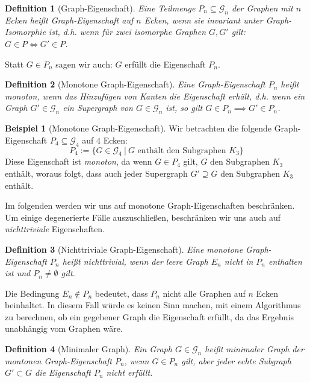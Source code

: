 \documentclass[10pt,a4paper, footheight=1mm]{scrreprt}
\newtheorem{definition}{Definition}
\theoremstyle{definition}
\newtheorem{examplex}{Beispiel}
\newenvironment{example}[1]
{ \begin{leftbar} \begin{examplex}#1}
{ \end{examplex} \ignorespacesafterend \end{leftbar} }
\begin{document}
\begin{definition}[Graph-Eigenschaft]
Eine Teilmenge $P_n \subseteq \mathcal{G}_n$ der Graphen mit
$n$ Ecken heißt \emph{Graph-Eigenschaft auf $n$ Ecken},
wenn sie invariant unter Graph-Isomorphie ist,
d.h. wenn für zwei isomorphe Graphen $G, G'$ gilt:
$G \in P \iff G' \in P$.
\end{definition}
Statt $G \in P_n$ sagen wir auch: $G$ erfüllt die Eigenschaft $P_n$.


\begin{definition}[Monotone Graph-Eigenschaft]
Eine Graph-Eigenschaft $P_n$ heißt \emph{monoton}, wenn das
Hinzufügen von Kanten die Eigenschaft erhält,
d.h. wenn ein Graph
$G' \in \mathcal{G}_n$ ein Supergraph von
$G \in \mathcal{G}_n$ ist, so gilt 
$G \in P_n \implies G' \in P_n$.
\end{definition}

\begin{example}[Monotone Graph-Eigenschaft]
\label{exmpl:Monotonie}
Wir betrachten die folgende Graph-Eigenschaft 
$P_4 \subseteq \mathcal{G}_4$ auf $4$ Ecken:
$$P_4 := \{ G \in \mathcal{G}_4 \ | \ G \text{ enthält den Subgraphen } K_3 \}$$
Diese Eigenschaft ist \emph{monoton}, da wenn 
$G \in P_4$ gilt, $G$ den Subgraphen $K_3$
enthält, woraus folgt, dass auch jeder Supergraph $G'\supseteq G$
den Subgraphen $K_3$ enthält. 
\end{example}

Im folgenden werden wir uns auf monotone Graph-Eigenschaften beschränken.
Um einige degenerierte Fälle auszuschließen, beschränken
wir uns auch auf \emph{nichttriviale} Eigenschaften.
\begin{definition}[Nichttriviale Graph-Eigenschaft]
Eine monotone Graph-Eigenschaft $P_n$ heißt \emph{nichttrivial},
wenn der leere Graph $E_n$ nicht in $P_n$ enthalten ist und
$P_n\neq \emptyset$ gilt.
\end{definition}
Die Bedingung $E_n \notin P_n$ bedeutet, dass $P_n$ nicht
alle Graphen auf $n$ Ecken beinhaltet. In diesem Fall würde
es keinen Sinn machen, mit einem Algorithmus zu berechnen,
ob ein gegebener Graph die Eigenschaft erfüllt, da das Ergebnis
unabhängig vom Graphen wäre.

\begin{definition}[Minimaler Graph]
Ein Graph $G \in \mathcal{G}_n$ heißt
\emph{minimaler Graph der montonen Graph-Eigenschaft $P_n$},
wenn $G \in P_n$ gilt, aber jeder echte Subgraph 
$G' \subset G$ die Eigenschaft $P_n$ nicht erfüllt.
\end{definition}
\end{document}
